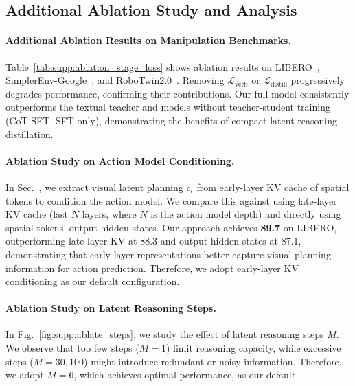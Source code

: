\subsection{Additional Ablation Study and Analysis}

\paragraph{Additional Ablation Results on Manipulation Benchmarks.} Table~\ref{tab:supp:ablation_stage_loss} shows ablation results on LIBERO~\cite{liu2023libero}, SimplerEnv-Google~\cite{li24simpler}, and RoboTwin2.0~\cite{chen2025robotwin2}. Removing $\mathcal{L}_{\text{verb}}$ or $\mathcal{L}_{\text{distill}}$ progressively degrades performance, confirming their contributions. Our full model consistently outperforms the textual teacher and models without teacher-student training (CoT-SFT, SFT only), demonstrating the benefits of compact latent reasoning distillation.




\paragraph{Ablation Study on Action Model Conditioning.} In Sec.~, we extract visual latent planning $c_t$ from early-layer KV cache of spatial tokens to condition the action model. We compare this against using late-layer KV cache (last $N$ layers, where $N$ is the action model depth) and directly using spatial tokens' output hidden states. Our approach achieves \textbf{89.7} on LIBERO, outperforming late-layer KV at 88.3 and output hidden states at 87.1, demonstrating that early-layer representations better capture visual planning information for action prediction. Therefore, we adopt early-layer KV conditioning as our default configuration.


\paragraph{Ablation Study on Latent Reasoning Steps.} In Fig.~\ref{fig:supp:ablate_steps}, we study the effect of latent reasoning steps $M$. We observe that too few steps ($M=1$) limit reasoning capacity, while excessive steps ($M=30, 100$) might introduce redundant or noisy information. Therefore, we adopt $M=6$, which achieves optimal performance, as our default.